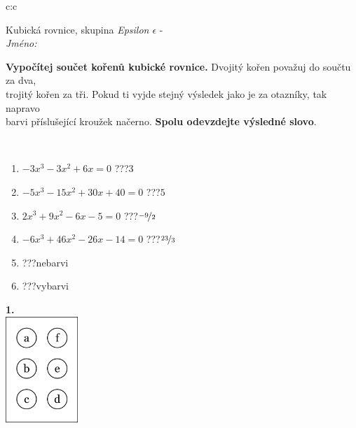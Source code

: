 \documentclass[10pt]{report}
\begin{document}
\begin{tabular}{c:c}
\begin{minipage}[c][104.5mm][t]{0.5\linewidth}
\begin{center}
\vspace{7mm}
{\huge Kubická rovnice, skupina \textit{Epsilon $\epsilon$} -}\\[5mm]
\textit{Jméno:}\phantom{xxxxxxxxxxxxxxxxxxxxxxxxxxxxxxxxxxxxxxxxxxxxxxxxxxxxxxxxxxxxxxxxx}\\[5mm]
\begin{minipage}{0.95\linewidth}
\begin{center}
\textbf{Vypočítej součet kořenů kubické rovnice.} Dvojitý kořen považuj do součtu za dva,\\trojitý kořen za tři. Pokud ti vyjde stejný výsledek jako je za otazníky, tak napravo\\barvi příslušející kroužek načerno. \textbf{Spolu odevzdejte výsledné slovo}.
\end{center}
\end{minipage}
\\[1mm]
\begin{minipage}{0.79\linewidth}
\begin{center}
\begin{varwidth}{\linewidth}
\begin{enumerate}
\Large
\item $-3x^3-3x^2+6x=0$\quad \dotfill\; ???\;\dotfill \quad $3$
\item $-5x^3-15x^2+30x+40=0$\quad \dotfill\; ???\;\dotfill \quad $5$
\item $2x^3+9x^2-6x-5=0$\quad \dotfill\; ???\;\dotfill \quad $\nicefrac{-9}{2}$
\item $-6x^3+46x^2-26x-14=0$\quad \dotfill\; ???\;\dotfill \quad $\nicefrac{23}{3}$
\item \quad \dotfill\; ???\;\dotfill \quad nebarvi
\item \quad \dotfill\; ???\;\dotfill \quad vybarvi
\end{enumerate}
\end{varwidth}
\end{center}
\end{minipage}
\begin{minipage}{0.20\linewidth}
\begin{center}
{\Huge\bfseries 1.} \\[2mm]
\includegraphics[height=40mm]{../images/braille.png}

\end{center}
\end{minipage}
\end{center}
\end{minipage}
\end{tabular}
\end{document}
